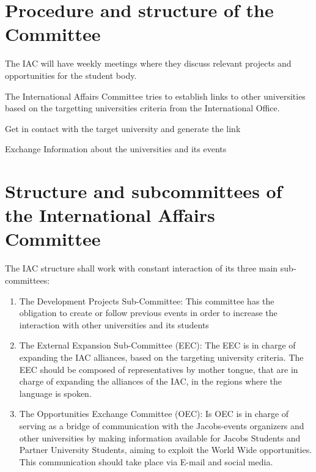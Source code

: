{\protect\section{Procedure and structure of the Committee}
The IAC will have weekly meetings where they discuss relevant projects and opportunities for the student body.
\protect\begin{parenum}
	\item The International Affairs Committee tries to establish links to other universities based on the targetting universities criteria from the International Office.
	\item Get in contact with the target university and generate the link
	\item  Exchange Information about the universities and its events
 \end{parenum}

\protect\section{Structure and subcommittees of the International Affairs Committee}
	The IAC structure shall work with constant interaction of its three main sub-committees:
	\protect\begin{enumerate}
		\item The Development Projects Sub-Committee:
		This committee has the obligation to create or follow previous events in order to increase the
		interaction with other universities and its students
		\item The External Expansion Sub-Committee (EEC):
		The EEC is in charge of expanding the IAC alliances, based on the targeting university criteria.
		The EEC should be composed of representatives by mother tongue, that are in charge of expanding the alliances of the IAC, in the regions where the language is spoken.
		\item The Opportunities Exchange Committee (OEC):
		Is OEC is in charge of serving as a bridge of communication with the Jacobs-events organizers and other universities by making information available for Jacobs Students and Partner University Students, aiming to exploit the World Wide opportunities.
		This communication should take place via E-mail and social media.
	\end{enumerate}

}
